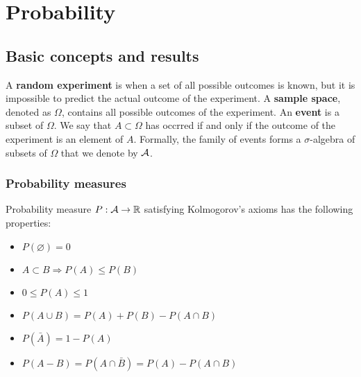 \chapter{Probability}

\section{Basic concepts and results}

A \textbf{random experiment} is when a set of all possible outcomes is known, but it is impossible to predict the actual outcome of the experiment.
A \textbf{sample space}, denoted as $\Omega$, contains all possible outcomes of the experiment.
An \textbf{event} is a subset of $\Omega$. We say that $A\subset\Omega$ has occrred if and only if the outcome of the experiment is an element of $A$. 
Formally, the family of events forms a $\sigma$-algebra of subsets of $\Omega$ that we denote by $\mathcal{A}$.
\subsection{Probability measures}

Probability measure $P: \mathcal{A}\to\mathbb{R}$ satisfying Kolmogorov's axioms has the following properties:
\begin{itemize}
    \item $P(\varnothing) = 0$
    \item $A\subset B\Rightarrow P(A) \leq P(B)$
    \item $0\leq P(A)\leq 1$
    \item $P(A\cup B) = P(A) + P(B) - P(A\cap B)$
    \item $P(\bar{A}) = 1 - P(A)$
    \item $P(A-B) = P(A\cap \bar{B}) = P(A) - P(A\cap B)$
\end{itemize}

